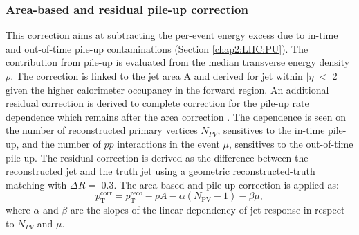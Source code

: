 \subsubsection{Area-based and residual pile-up correction}
\label{Jet:Cal:chain:AreaPU}
This correction aims at subtracting the per-event energy excess due to in-time and out-of-time pile-up contaminations (Section \ref{chap2:LHC:PU}). The contribution from pile-up is evaluated from the median transverse energy density $\rho$. The correction is linked to the jet area A and derived for jet within $|\eta|<$ 2 given the higher calorimeter occupancy in the forward region. An additional residual correction is derived to complete correction for the pile-up rate dependence  which remains after the area correction \cite{PileUp_Sub}. The dependence is seen on the number of reconstructed primary vertices $N_{PV}$, sensitives to the in-time pile-up, and the number of $pp$ interactions in the event $\mu$, sensitives to the out-of-time pile-up. The residual correction is derived as the difference between the reconstructed jet \pT and the truth jet \pT using a geometric reconstructed-truth matching with $\Delta R= $ 0.3. The area-based and pile-up correction is applied as:
\begin{equation}
    p_{\mathrm{T}}^{\mathrm{corr}}=p_{\mathrm{T}}^{\mathrm{reco}}-\rho A-\alpha\left(N_{\mathrm{PV}}-1\right)-\beta \mu,
\end{equation}
where $\alpha$ and $\beta$ are the slopes of the linear dependency of jet response in respect to $N_{PV}$ and $\mu$.

